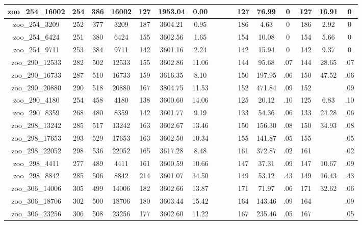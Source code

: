 \begin{landscape}
\begin{longtable}{|c|c|c|c|c|c|c|c|c|c|c|c|c|c|c|c|}
zoo\_254\_16002 & 254 & 386 & 16002 & 127 & 1953.04 & 0.00 &  &  &  & 127 & 76.99 & 0 & 127 & 16.91 & 0 \\ \hline 
zoo\_254\_3209 & 252 & 377 & 3209 & 187 & 3604.21 & 0.95 &  &  &  & 186 & 4.63 & 0 & 186 & 2.92 & 0 \\ \hline 
zoo\_254\_6424 & 251 & 380 & 6424 & 155 & 3602.56 & 1.65 &  &  &  & 154 & 10.08 & 0 & 154 & 5.66 & 0 \\ \hline 
zoo\_254\_9711 & 253 & 384 & 9711 & 142 & 3601.16 & 2.24 &  &  &  & 142 & 15.94 & 0 & 142 & 9.37 & 0 \\ \hline 
zoo\_290\_12533 & 282 & 502 & 12533 & 155 & 3602.86 & 11.06 &  &  &  & 144 & 95.68 & .07 & 144 & 28.65 & .07 \\ \hline 
zoo\_290\_16733 & 287 & 510 & 16733 & 159 & 3616.35 & 8.10 &  &  &  & 150 & 197.95 & .06 & 150 & 47.52 & .06 \\ \hline 
zoo\_290\_20880 & 290 & 518 & 20880 & 167 & 3804.75 & 11.53 &  &  &  & 152 & 471.84 & .09 & 152 &  & .09 \\ \hline 
zoo\_290\_4180 & 254 & 458 & 4180 & 138 & 3600.60 & 14.06 &  &  &  & 125 & 20.12 & .10 & 125 & 6.83 & .10 \\ \hline 
zoo\_290\_8359 & 268 & 480 & 8359 & 142 & 3601.77 & 9.19 &  &  &  & 133 & 54.36 & .06 & 133 & 24.28 & .06 \\ \hline 
zoo\_298\_13242 & 285 & 517 & 13242 & 163 & 3602.67 & 13.46 &  &  &  & 150 & 156.30 & .08 & 150 & 34.93 & .08 \\ \hline 
zoo\_298\_17653 & 293 & 529 & 17653 & 163 & 3602.50 & 10.34 &  &  &  & 155 & 141.87 & .05 & 155 &  & .05 \\ \hline 
zoo\_298\_22052 & 298 & 536 & 22052 & 165 & 3617.28 & 8.48 &  &  &  & 161 & 372.87 & .02 & 161 &  & .02 \\ \hline 
zoo\_298\_4411 & 277 & 489 & 4411 & 161 & 3600.59 & 10.66 &  &  &  & 147 & 37.31 & .09 & 147 & 10.67 & .09 \\ \hline 
zoo\_298\_8842 & 285 & 506 & 8842 & 214 & 3601.07 & 34.50 &  &  &  & 149 & 53.12 & .43 & 149 & 16.43 & .43 \\ \hline 
zoo\_306\_14006 & 305 & 499 & 14006 & 182 & 3602.66 & 13.87 &  &  &  & 171 & 71.97 & .06 & 171 & 32.62 & .06 \\ \hline 
zoo\_306\_18706 & 302 & 500 & 18706 & 180 & 3603.44 & 15.42 &  &  &  & 164 & 143.46 & .09 & 164 &  & .09 \\ \hline 
zoo\_306\_23256 & 306 & 508 & 23256 & 177 & 3602.60 & 11.22 &  &  &  & 167 & 235.46 & .05 & 167 &  & .05 \\ \hline 

\end{longtable}
\end{landscape}
